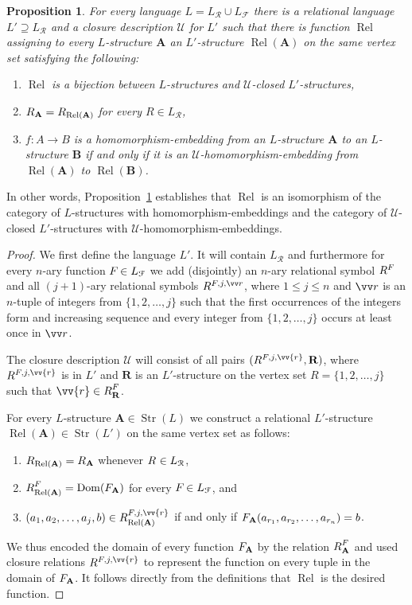 \documentclass{elsarticle}
\def\dom{\mathop{\mathrm{Dom}}\nolimits}
\def\Rel{\mathop{\mathrm{Rel}}\nolimits}
\def\Str{\mathop{\mathrm{Str}}\nolimits}
\def\str#1{\mathbf {#1}}
\def\nbrel#1#2{R\ifstrempty{#1}{}{_{#1}}\ifstrempty{#2}{}{^{#2}}}
\def\rel#1#2{\nbrel{\ifstrempty{#1}{}{\str{#1}}}{#2}}
\def\func#1#2{\nbfunc{\ifstrempty{#1}{}{\str{#1}}}{#2}}
\def\nbfunc#1#2{F\ifstrempty{#1}{}{_{#1}}\ifstrempty{#2}{}{^{#2}}}
\theoremstyle{plain}
\newtheorem{prop}[theorem]{Proposition}
\theoremstyle{definition}
\theoremstyle{remark}
\begin{document}
\begin{prop}
\label{prop:closures}
For every language $L=L_\mathcal R \cup L_\mathcal F$ there is a relational language $L'\supseteq L_\mathcal R$ and a closure
description $\mathcal U$ for $L'$ such that there is function $\Rel$ assigning to every $L$-structure $\str{A}$ an $L'$-structure $\Rel(\str{A})$
on the same vertex set satisfying the following:
\begin{enumerate}
\item $\Rel$ is a bijection between $L$-structures and $\mathcal U$-closed $L'$-structures,
\item $\rel{A}{}=\nbrel{\Rel(\str{A})}{}$ for every $R\in L_\mathcal R$,
\item $f\colon A\to B$ is a homomorphism-embedding from an $L$-structure $\str{A}$ to an $L$-structure $\str{B}$ if and only if it is an $\mathcal U$-homomorphism-embedding
from $\Rel(\str{A})$ to $\Rel(\str{B})$.
\end{enumerate}
\end{prop}
In other words, Proposition~\ref{prop:closures} establishes that $\Rel$ is an isomorphism of the category
of $L$-structures with homomorphism-embeddings and the category of $\mathcal U$-closed $L'$-structures with $\mathcal U$-homomorphism-embeddings.
\begin{proof}
We first define the language $L'$. It will contain $L_\mathcal R$ and furthermore for every $n$-ary function $\func{}{}\in L_\mathcal F$ we add (disjointly) an $n$-ary relational symbol $\rel{}{\func{}{}}$ and all $(j+1)$-ary relational symbols $\rel{}{\func{}{},j,{\vv r}}$, where $1\leq j\leq n$ and $\vv r$ is an $n$-tuple of integers from $\{1,2,\ldots, j\}$ such that the first occurrences of the integers form and increasing sequence and every integer from $\{1,2,\ldots, j\}$ occurs at least once in $\vv r$.

The closure description $\mathcal U$ will consist of all pairs
$(\rel{}{\func{}{},j,{\vv{r}}},\str{R})$, where $\rel{}{\func{}{},j,{\vv{r}}}$ is in $L'$ and
$\str{R}$ is an $L'$-structure on the vertex set $R=\{1,2,\ldots, j\}$ such that
$\vv{r}\in \rel{R}{\func{}{}}$.

For every $L$-structure $\str{A}\in \Str(L)$ we construct
a relational $L'$-structure $\Rel(\str{A})\in \Str(L')$ on
the same vertex set as follows:
\begin{enumerate}
 \item $\nbrel{\Rel(\str{A})}{}=\rel{A}{}$ whenever $\rel{}{}\in L_\mathcal R$,
 \item $\nbrel{\Rel(\str{A})}{\func{}{}}=\dom(\func{A}{})$ for every $\func{}{}\in L_\mathcal F$, and
 \item $(a_1,a_2,\ldots, a_j,b)\in \nbrel{\Rel(\str{A})}{\func{}{},j,{\vv{r}}}$ if and only if $\func{A}{}(a_{r_1},a_{r_2},\ldots, a_{r_n})=b$.
\end{enumerate}

We thus encoded the domain of every function $\func{A}{}$ by the relation $\rel{A}{\func{}{}}$ and
used closure relations $\rel{}{\func{}{},j,{\vv{r}}}$ to represent the function on every tuple in the domain of $\func{A}{}$.
It follows directly from the definitions that $\Rel$ is the desired function.
\end{proof}
\end{document}
